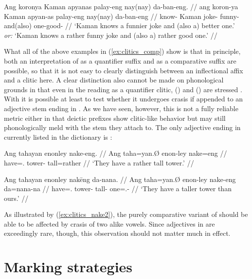 \a\label{ex:clitics_comp3}\begingl
	\gla Ang koronya Kaman apyanas palay-eng nay(nay) da-ban-eng. //
	\glb ang koron-ya Kaman apyan-as palay-eng nay(nay) da-ban-eng //
	\glc \AgtT{} know-\TsgM{} Kaman joke-\Parg{} funny-\Comp{} 
		and(\til{}also) one-good-\Comp{} //
	\glft `Kaman knows a funnier joke and (also a) better one.' \\
		\textit{or:} `Kaman knows a rather funny joke and (also a) rather good 
		one.' //
\endgl
\xe

What all of the above examples in (\ref{ex:clitics_comp}) show is that in
principle, both an interpretation of  as a quantifier suffix
and as a comparative suffix are possible, so that it is not easy to clearly
distinguish between an inflectional affix and a clitic here. A clear
distinction also cannot be made on phonological grounds in that even in the
reading as a quantifier clitic,  (\Comp{}) and
 (\Supl{}) are stressed 
\parencite[compare][90--92]{spencerluis2012}. With  it is
possible at least to test whether it undergoes crasis if appended to an
adjective stem ending in . As we have seen, however, this is not a
fully reliable metric either in that deictic prefixes show clitic-like behavior
but may still phonologically meld with the stem they attach to. The only
adjective ending in  currently listed in the dictionary is 
:

\pex\label{ex:clitics_nake}
\a\label{ex:clitics_nake1}\begingl
	\gla Ang tahayan enonley nake-eng. //
	\glb Ang taha=yan.Ø enon-ley nake=eng //
	\glc \Aarg{} have=\TplM{}.\Top{} tower-\PargI{} tall=rather //
	\glft `They have a rather tall tower.' //
\endgl

\a\label{ex:clitics_nake2}\begingl
	\gla Ang tahayan enonley nakēng da-nana. //
	\glb Ang taha=yan.Ø enon-ley nake-eng da=nana-na //
	\glc \Aarg{} have=\TplM{}.\Top{} tower-\PargI{} tall-\Comp{}
		one=\Fpl{}.\Gen{}-\Gen{} //
	\glft `They have a taller tower than ours.' //
\endgl
\xe

As illustrated by (\ref{ex:clitics_nake2}), the purely comparative variant of
 should be able to be affected by crasis of two alike vowels.
Since adjectives in  are exceedingly rare, though, this
observation should not matter much in effect.

\section{Marking strategies}
\label{sec:markstrat}

